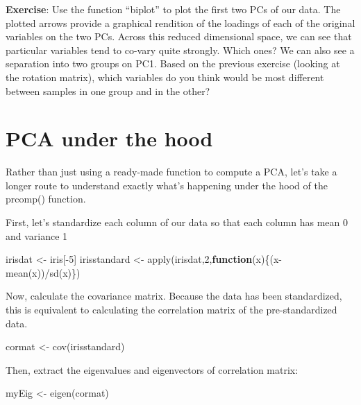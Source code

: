 \documentclass[
]{book}
\newenvironment{Shaded}{\begin{snugshade}}{\end{snugshade}}
\newcommand{\ControlFlowTok}[1]{\textcolor[rgb]{0.13,0.29,0.53}{\textbf{#1}}}
\newcommand{\DecValTok}[1]{\textcolor[rgb]{0.00,0.00,0.81}{#1}}
\newcommand{\FunctionTok}[1]{\textcolor[rgb]{0.00,0.00,0.00}{#1}}
\newcommand{\NormalTok}[1]{#1}
\newcommand{\OtherTok}[1]{\textcolor[rgb]{0.56,0.35,0.01}{#1}}
\newcommand{\SpecialCharTok}[1]{\textcolor[rgb]{0.00,0.00,0.00}{#1}}
\begin{document}
\textbf{Exercise}: Use the function ``biplot'' to plot the first two PCs of our data. The plotted arrows provide a graphical rendition of the loadings of each of the original variables on the two PCs. Across this reduced dimensional space, we can see that particular variables tend to co-vary quite strongly. Which ones? We can also see a separation into two groups on PC1. Based on the previous exercise (looking at the rotation matrix), which variables do you think would be most different between samples in one group and in the other?

\hypertarget{pca-under-the-hood}{%
\section{PCA under the hood}\label{pca-under-the-hood}}

Rather than just using a ready-made function to compute a PCA, let's take a longer route to understand exactly what's happening under the hood of the prcomp() function.

First, let's standardize each column of our data so that each column has mean 0 and variance 1

\begin{Shaded}
\begin{Highlighting}[]
\NormalTok{irisdat }\OtherTok{\textless{}{-}}\NormalTok{ iris[}\SpecialCharTok{{-}}\DecValTok{5}\NormalTok{]}
\NormalTok{irisstandard }\OtherTok{\textless{}{-}} \FunctionTok{apply}\NormalTok{(irisdat,}\DecValTok{2}\NormalTok{,}\ControlFlowTok{function}\NormalTok{(x)\{(x}\SpecialCharTok{{-}}\FunctionTok{mean}\NormalTok{(x))}\SpecialCharTok{/}\FunctionTok{sd}\NormalTok{(x)\})}
\end{Highlighting}
\end{Shaded}

Now, calculate the covariance matrix. Because the data has been standardized, this is equivalent to calculating the correlation matrix of the pre-standardized data.

\begin{Shaded}
\begin{Highlighting}[]
\NormalTok{cormat }\OtherTok{\textless{}{-}} \FunctionTok{cov}\NormalTok{(irisstandard)}
\end{Highlighting}
\end{Shaded}

Then, extract the eigenvalues and eigenvectors of correlation matrix:

\begin{Shaded}
\begin{Highlighting}[]
\NormalTok{myEig }\OtherTok{\textless{}{-}} \FunctionTok{eigen}\NormalTok{(cormat)}
\end{Highlighting}
\end{Shaded}
\end{document}
